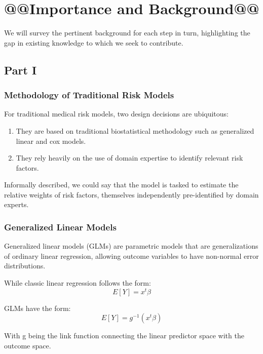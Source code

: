 \documentclass[a4paper,12pt]{article}
\begin{document}
	\section{@@Importance and Background@@}
	
	We will survey the pertinent background for each step in turn, highlighting the gap in existing knowledge to which we seek to contribute.
	
		\subsection{Part I}
		
		\subsubsection{Methodology of Traditional Risk Models}
		
		For traditional medical risk models, two design decisions are ubiquitous\cite{Weng2017}:
		\begin{enumerate}
			\item They are based on traditional biostatistical methodology such as generalized linear and cox models.
			\item They rely heavily on the use of domain expertise to identify relevant risk factors.
		\end{enumerate}
		
		Informally described, we could say that the model is tasked to estimate the relative weights of risk factors, themselves independently pre-identified by domain experts.
		
		\subsubsection{Generalized Linear Models}
		
		Generalized linear models (GLMs) are parametric models that are generalizations of ordinary linear regression, allowing outcome variables to have non-normal error distributions\cite{Nelder1972}.
		
		While classic linear regression follows the form:
		\begin{equation*}
		E[Y] = x^t \beta
		\end{equation*}
		
		GLMs have the form:
		\begin{equation*}
		E[Y] = g^{-1} (x^t \beta)
		\end{equation*}
		
		With g being the link function connecting the linear predictor space with the outcome space.
		
\end{document}
